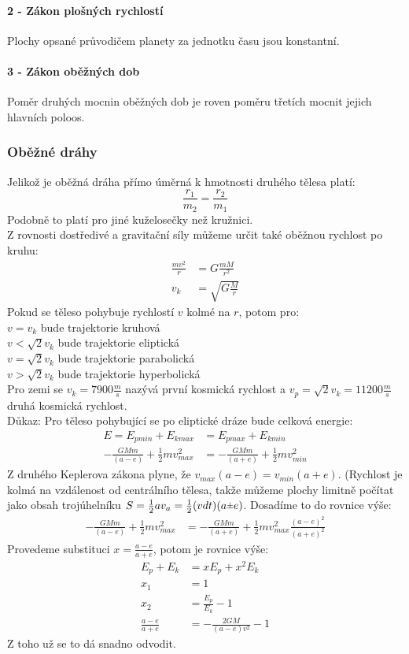 \documentclass[titlepage]{book}
\newcommand{\rpm}{\sbox0{$1$}\sbox2{$\scriptstyle\pm$}
  \raise\dimexpr(\ht0-\ht2)/2\relax\box2 }
\begin{document}
\paragraph{2 - Zákon plošných rychlostí}
Plochy opsané průvodičem planety za jednotku času jsou konstantní.
\paragraph{3 - Zákon oběžných dob}
Poměr druhých mocnin oběžných dob je roven poměru třetích mocnit jejich hlavních poloos.
\subsubsection{Oběžné dráhy}
Jelikož je oběžná dráha přímo úměrná k hmotnosti druhého tělesa platí:\\
\begin{equation}
\frac{r_1}{m_2} = \frac{r_2}{m_1}
\end{equation}
Podobně to platí pro jiné kuželosečky než kružnici.\\
Z rovnosti dostředivé a gravitační síly můžeme určit také oběžnou rychlost po kruhu:\\
\begin{align}
\frac{m v^2}{r} &= G \frac{mM}{r^2}\\
v_k &= \sqrt{G \frac{M}{r}}
\end{align}
Pokud se těleso pohybuje rychlostí $v$ kolmé na $r$, potom pro:\\
$v = v_k$ bude trajektorie kruhová\\
$v < \sqrt{2}v_k$ bude trajektorie eliptická\\
$v = \sqrt{2}v_k$ bude trajektorie parabolická\\
$v > \sqrt{2}v_k$ bude trajektorie hyperbolická\\
Pro zemi se $v_k = 7900 \frac{m}{s}$ nazývá první kosmická rychlost a $v_p = \sqrt{2}v_k = 11200 \frac{m}{s}$ druhá kosmická rychlost.\\
Důkaz: Pro těleso pohybující se po eliptické dráze bude celková energie:
\begin{align}
E = E_{p min} + E_{k max} &= E_{p max} + E_{k min}\\
-\frac{GMm}{(a-e)} + \frac{1}{2}mv_{max}^2 &= -\frac{GMm}{(a+e)} + \frac{1}{2}mv_{min}^2
\end{align}
Z druhého Keplerova zákona plyne, že $v_{max}(a-e) = v_{min}(a+e)$. (Rychlost je kolmá na vzdálenost od centrálního tělesa, takže můžeme plochy limitně počítat jako obsah trojúhelníku $S = \frac{1}{2}av_a = \frac{1}{2}(vdt)(a\rpm e)$. Dosadíme to do rovnice výše:
\begin{align}
-\frac{GMm}{(a-e)} + \frac{1}{2}mv_{max}^2 &= -\frac{GMm}{(a+e)} + \frac{1}{2}mv_{max}^2\frac{(a-e)^2}{(a+e)^2}
\end{align}
Provedeme substituci $x = \frac{a-e}{a+e}$, potom je rovnice výše:
\begin{align}
E_p + E_k &= xE_p + x^2E_k\\
x_1 &= 1\\
x_2 &= \frac{E_p}{E_k} - 1\\
\frac{a-e}{a+e} &= -\frac{2GM}{(a-e)v^2} - 1
\end{align}
Z toho už se to dá snadno odvodit.
\end{document}

